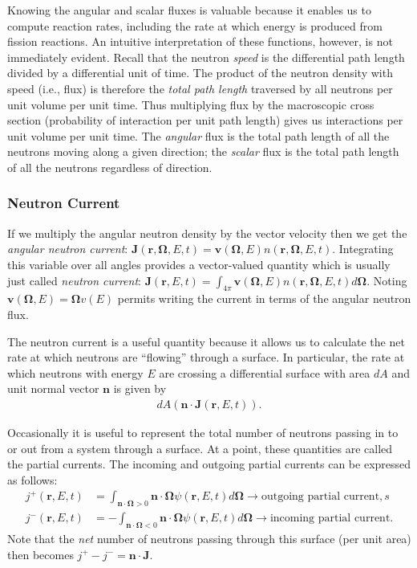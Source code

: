\documentclass[11pt]{article}
\renewcommand\vec{\mathbf}
\begin{document}
Knowing the angular and scalar fluxes is valuable because it enables us to compute reaction rates, including the rate at which energy is produced from fission reactions.  An intuitive interpretation of these functions, however, is not immediately evident.  Recall that the neutron \emph{speed} is the differential path length divided by a differential unit of time.  The product of the neutron density with speed (i.e., flux) is therefore the \emph{total path length} traversed by all neutrons per unit volume per unit time.  Thus multiplying flux by the macroscopic cross section (probability of interaction per unit path length) gives us interactions per unit volume per unit time.  The \emph{angular} flux is the total path length of all the neutrons moving along a given direction; the \emph{scalar} flux is the total path length of all the neutrons regardless of direction.

\subsubsection{Neutron Current}
\label{sec:orgheadline44}
If we multiply the angular neutron density by the vector velocity then we get the \emph{angular neutron current}: \(\vec{J}(\vec{r},\vec{\Omega},E,t) = \vec{v}(\vec{\Omega},E) n(\vec{r},\vec{\Omega},E,t)\).  Integrating this variable over all angles provides a vector-valued quantity which is usually just called \emph{neutron current}: \(\vec{J}(\vec{r},E,t) = \int_{4\pi} \vec{v}(\vec{\Omega},E) n(\vec{r},\vec{\Omega},E,t) d\vec{\Omega}\).  Noting \(\vec{v}(\vec{\Omega},E) = \vec{\Omega}v(E)\) permits writing the current in terms of the angular neutron flux.

The neutron current is a useful quantity because it allows us to calculate the net rate at which neutrons are ``flowing'' through a surface.  In particular, the rate at which neutrons with energy \(E\) are crossing a differential surface with area \(dA\) and unit normal vector \(\vec{n}\) is given by
\begin{align}
  dA \left( \vec{n} \cdot \vec{J}(\vec{r},E,t) \right).
\end{align}

Occasionally it is useful to represent the total number of neutrons passing in to or out from a system through a surface.  At a point, these quantities are called the partial currents.  The incoming and outgoing partial currents can be expressed as follows:
\begin{align}
  j^+(\vec{r},E,t) &= \int_{\vec{n}\cdot\vec{\Omega}>0} \vec{n} \cdot \vec{\Omega} \psi(\vec{r},E,t) d\vec{\Omega} \rightarrow \text{outgoing partial current},s \\
  j^-(\vec{r},E,t) &= -\int_{\vec{n}\cdot\vec{\Omega}<0} \vec{n} \cdot \vec{\Omega} \psi(\vec{r},E,t) d\vec{\Omega} \rightarrow \text{incoming partial current}.
\end{align}
Note that the \emph{net} number of neutrons passing through this surface (per unit area) then becomes \(j^+ - j^- = \vec{n}\cdot\vec{J}\).
\end{document}
